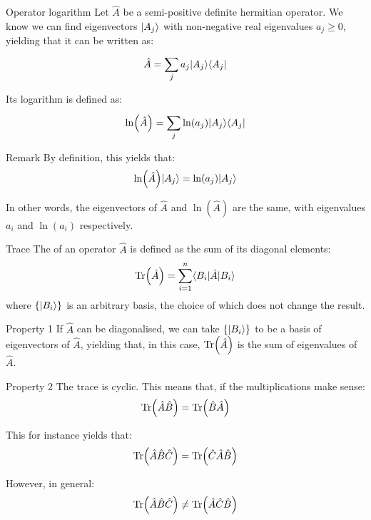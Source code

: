 \documentclass[a4paper]{article}
\begin{document}
\begin{parag}{Operator logarithm}
    Let $\hat{A}$ be a semi-positive definite hermitian operator. We know we can find eigenvectors $\ket{A_j}$ with non-negative real eigenvalues $a_j \geq 0$, yielding that it can be written as: 
    \[\hat{A} = \sum_{j}^{} a_j \ket{A_j} \bra{A_j}\]
    
    Its logarithm is defined as: 
    \[\ln\left(\hat{A}\right) = \sum_{j}^{} \ln\left(a_j\right) \ket{A_j} \bra{A_j}\]
    
    \begin{subparag}{Remark}
        By definition, this yields that: 
        \[\ln\left(\hat{A}\right) \ket{A_j} = \ln\left(a_j\right) \ket{A_j}\]

        In other words, the eigenvectors of $\hat{A}$ and $\ln\left(\hat{A}\right)$ are the same, with eigenvalues $a_i$ and $\ln\left(a_i\right)$ respectively.
    \end{subparag}
\end{parag}

\begin{parag}{Trace}
    The  of an operator $\hat{A}$ is defined as the sum of its diagonal elements: 
    \[\Tr\left(\hat{A}\right) = \sum_{i=1}^{n} \bra{B_i} \hat{A} \ket{B_i}\]
    where $\left\{\ket{B_i}\right\}$ is an arbitrary basis, the choice of which does not change the result.

    \begin{subparag}{Property 1}
        If $\hat{A}$ can be diagonalised, we can take $\left\{\ket{B_i}\right\}$ to be a basis of eigenvectors of $\hat{A}$, yielding that, in this case, $\Tr\left(\hat{A}\right)$ is the sum of eigenvalues of $\hat{A}$.
    \end{subparag}

    \begin{subparag}{Property 2}
        The trace is cyclic. This means that, if the multiplications make sense: 
        \[\Tr\left(\hat{A}\hat{B}\right) = \Tr\left(\hat{B}\hat{A}\right)\]
        
        This for instance yields that: 
        \[\Tr\left(\hat{A} \hat{B} \hat{C}\right) = \Tr\left(\hat{C} \hat{A} \hat{B}\right)\]

        However, in general: 
        \[\Tr\left(\hat{A} \hat{B} \hat{C}\right) \neq \Tr\left(\hat{A} \hat{C} \hat{B}\right)\]
    \end{subparag}
\end{parag}
\end{document}
